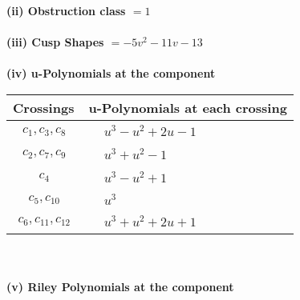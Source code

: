 \documentclass[1p]{elsarticle_modified}
\theoremstyle{definition}
\begin{document}
\flushleft \textbf{(ii) Obstruction class $= 1$}\\~\\
\flushleft \textbf{(iii) Cusp Shapes $= -5 v^2-11 v-13$}\\~\\
\newpage\renewcommand{\arraystretch}{1}
\flushleft \textbf{(iv) u-Polynomials at the component}\newline \\
\begin{tabular}{m{50pt}|m{274pt}}
Crossings & \hspace{64pt}u-Polynomials at each crossing \\
\hline $$\begin{aligned}c_{1},c_{3},c_{8}\end{aligned}$$&$\begin{aligned}
&u^3- u^2+2 u-1
\end{aligned}$\\
\hline $$\begin{aligned}c_{2},c_{7},c_{9}\end{aligned}$$&$\begin{aligned}
&u^3+u^2-1
\end{aligned}$\\
\hline $$\begin{aligned}c_{4}\end{aligned}$$&$\begin{aligned}
&u^3- u^2+1
\end{aligned}$\\
\hline $$\begin{aligned}c_{5},c_{10}\end{aligned}$$&$\begin{aligned}
&u^3
\end{aligned}$\\
\hline $$\begin{aligned}c_{6},c_{11},c_{12}\end{aligned}$$&$\begin{aligned}
&u^3+u^2+2 u+1
\end{aligned}$\\
\hline
\end{tabular}\\~\\
\newpage\renewcommand{\arraystretch}{1}
\flushleft \textbf{(v) Riley Polynomials at the component}\newline \\
\end{document}

